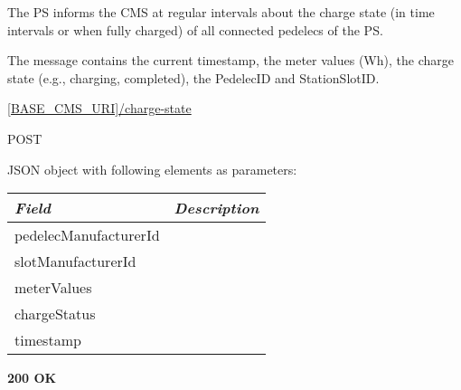 The \acs{PS} informs the \acs{CMS} at regular intervals about the charge state (in time intervals or when fully charged) of all connected pedelecs of the \acs{PS}.

The message contains the current timestamp, the meter values (Wh), the charge state (e.g., charging, completed), the PedelecID and StationSlotID.

 \url{[BASE_CMS_URI]/charge-state}

 POST

JSON object with following elements as parameters:\\
\begin{tabularx}{\linewidth}{ | l | X | }
  \hline
  \textit{Field} & \textit{Description} \\
  \hline \hline
  	pedelecManufacturerId			& \\
  	slotManufacturerId					& \\
  	meterValues			& \\
  	chargeStatus			& \\
 	timestamp			& \\
  	
    \hline
\end{tabularx}

\textbf{200 OK}\\